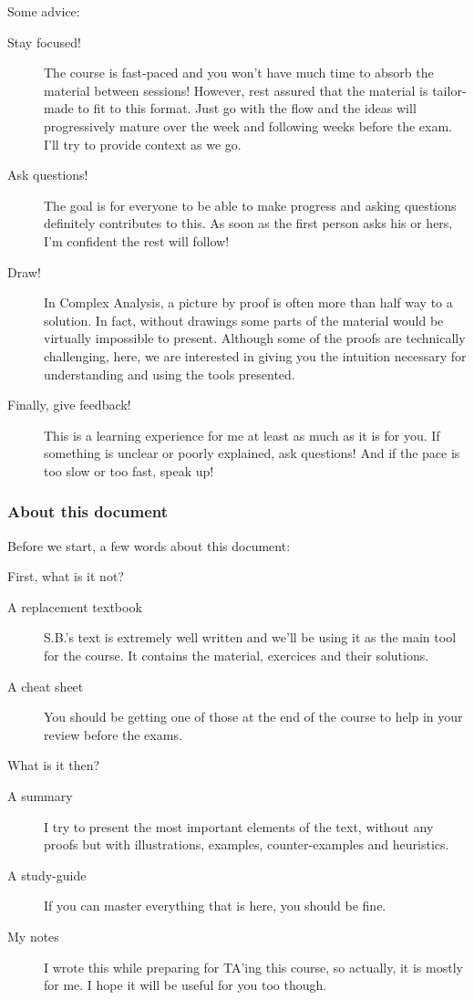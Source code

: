 Some advice:
\begin{description}
    \item[Stay focused!] The course is fast-paced and you won't have much time to absorb the material between sessions! However, rest assured that the material is tailor-made to fit to this format. Just go with the flow and the ideas will progressively mature over the week and following weeks before the exam. I'll try to provide context as we go. 
    \item [Ask questions!] The goal is for everyone to be able to make progress and asking questions definitely contributes to this. As soon as the first person asks his or hers, I'm confident the rest will follow!
    \item [Draw!] In Complex Analysis, a picture by proof is often more than half way to a solution. In fact, without drawings some parts of the material would be virtually impossible to present.  Although some of the proofs are technically challenging, here, we are interested in giving you the intuition necessary for understanding and using the tools presented.
    \item [Finally, give feedback!] This is a learning experience for me at least as much as it is for you. If something is unclear or poorly explained, ask questions! And if the pace is too slow or too fast, speak up!
\end{description}

\subsubsection{About this document}
Before we start, a few words about this document:

First, what is it not?
\begin{description}
    \item [A replacement textbook] S.B.'s text is extremely well written and we'll be using it as the main tool for the course. It contains the material, exercices and their solutions.
    \item [A cheat sheet] You should be getting one of those at the end of the course to help in your review before the exams.
\end{description}
What is it then?
\begin{description}
    \item [A summary] I try to present the most important elements of the text, without any proofs but with illustrations, examples, counter-examples and heuristics.
    \item [A study-guide] If you can master everything that is here, you should be fine.
    \item [My notes] I wrote this while preparing for TA'ing this course, so actually, it is mostly for me. I hope it will be useful for you too though.
\end{description}

